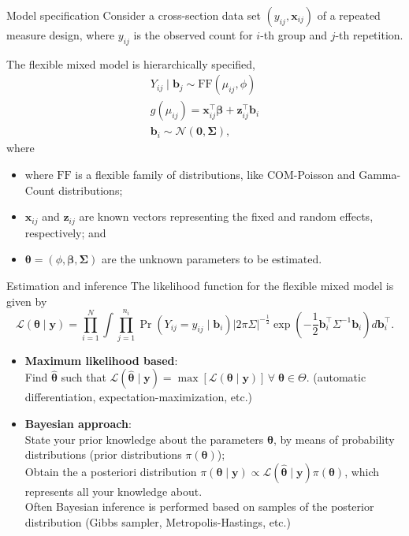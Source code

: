 \documentclass[11pt]{beamer}\usepackage[]{graphicx}\usepackage[]{color}
\begin{document}
\begin{frame}{Model specification}
  \small
  Consider a cross-section data set $(y_{ij}, \bm{x}_{ij})$ of a
  repeated measure design, where $y_{ij}$ is the observed count for
  $i$-th group and $j$-th repetition.

  The flexible mixed model is hierarchically specified,
  $$
  \begin{gathered}
    Y_{ij} \mid \bm{b}_{j} \sim \text{FF}(\mu_{ij}, \phi)\\
    g(\mu_{ij}) = \bm{x}_{ij}^\top \bm{\beta} +
    \bm{z}_{ij}^\top \bm{b}_{i}\\
    \bm{b}_i  \sim  \mathcal{N}(\bm{0}, \bm{\Sigma}),
  \end{gathered}
  $$
  where
  \begin{itemize}
  \item where $\text{FF}$ is a flexible family of distributions, like
    COM-Poisson and Gamma-Count distributions;
  \item $\bm{x}_{ij}$ and $\bm{z}_{ij}$ are known vectors representing
    the fixed and random effects, respectively; and
  \item $\bm{\theta} = (\phi, \bm{\beta}, \bm{\Sigma})$ are the unknown
    parameters to be estimated.
  \end{itemize}
\end{frame}

\begin{frame}{Estimation and inference}
  \small
  The likelihood function for the flexible mixed model is given by
  \begin{equation*}
    \label{eqn:likelihood}
    \mathcal{L}(\bm{\theta} \mid \bm{y}) =
    \prod_{i=1}^N \int \prod_{j=1}^{n_i}
    \Pr(Y_{ij} = y_{ij} \mid \bm{b}_{i})
    \left | 2\pi\Sigma \right |^{-\frac{1}{2}}
    \exp \left ( -\frac{1}{2} \bm{b}_i^\top
      \Sigma^{-1} \bm{b}_i \right ) d \bm{b}_i^\top.
  \end{equation*}

  \begin{itemize}
  \item \textbf{Maximum likelihood based}:\\
    Find $\hat{\bm{\theta}}$ such that
    $\mathcal{L}(\hat{\bm{\theta}} \mid \bm{y}) =
    \max [\mathcal{L}(\bm{\theta} \mid \bm{y} )]\,
    \forall \; \bm{\theta} \in \Theta.$ (automatic differentiation,
    expectation-maximization, etc.)
  \item \textbf{Bayesian approach}:\\
    State your prior knowledge about the parameters $\bm{\theta}$, by
    means of probability distributions (prior distributions
    $\pi(\bm{\theta})$); \\[0.1cm]
    Obtain the a posteriori distribution
    $\pi(\bm{\theta} \mid \bm{y}) \propto \mathcal{L}(\hat{\bm{\theta}}
    \mid \bm{y}) \pi(\bm{\theta})$,
    which represents all your knowledge about.\\[0.1cm]
    Often Bayesian inference is performed based on samples of the
    posterior distribution (Gibbs sampler, Metropolis-Hastings, etc.)
  \end{itemize}
\end{frame}
\end{document}
